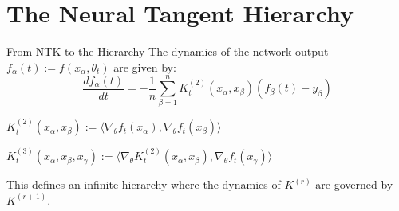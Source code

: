 \documentclass{beamer}
\begin{document}
\section{The Neural Tangent Hierarchy}

\begin{frame}{From NTK to the Hierarchy}
The dynamics of the network output $f_\alpha(t) := f(x_\alpha, \theta_t)$ are given by:
\[
\frac{d f_\alpha(t)}{dt} = -\frac{1}{n} \sum_{\beta=1}^n K^{(2)}_t(x_\alpha, x_\beta) (f_\beta(t) - y_\beta)
\]
\begin{definition}
$K^{(2)}_t(x_\alpha, x_\beta) := \langle \nabla_\theta f_t(x_\alpha), \nabla_\theta f_t(x_\beta) \rangle$
\end{definition}
\vspace{0.5cm}

\begin{definition}
$K^{(3)}_t(x_\alpha, x_\beta, x_\gamma) := \langle \nabla_\theta K^{(2)}_t(x_\alpha, x_\beta), \nabla_\theta f_t(x_\gamma) \rangle$
\end{definition}
This defines an infinite hierarchy where the dynamics of $K^{(r)}$ are governed by $K^{(r+1)}$.
\end{frame}
\end{document}
